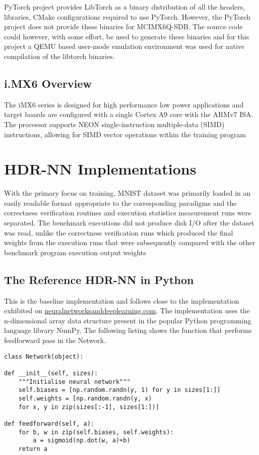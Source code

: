 PyTorch project provides LibTorch as a binary distribution of all the headers, libraries, CMake configurations required to use PyTorch. However, the PyTorch project does not provide these binaries for MCIMX6Q-SDB. The source code could however, with some effort, be used to generate these binaries and for this project a QEMU based user-mode emulation environment was used for native compilation of the libtorch binaries.

\subsection{i.MX6 Overview}

The iMX6 series is designed for high performance low power applications and target boards are configured with a single Cortex A9 core with the ARMv7 ISA. The processor supports NEON single-instruction multiple-data (SIMD) instructions, allowing for SIMD vector operations within the training program

\section{HDR-NN Implementations}

With the primary focus on training, MNIST dataset was primarily loaded in an easily readable format appropriate to the corresponding paradigms and the correctness verification routines and execution statistics measurement runs were separated. The benchmark executions did not produce disk I/O after the dataset was read, unlike the correctness verification runs which produced the final weights from the execution runs that were subsequently compared with the other benchmark program execution output weights


\subsection{The Reference HDR-NN in Python}

This is the baseline implementation and follows close to the implementation exhibited on \href{http://neuralnetworksanddeeplearning.com}{neuralnetworksanddeeplearning.com}. The implementation uses the n-dimensional array data structure present in the popular Python programming language library NumPy. The following listing shows the function that performs feedforward pass in the Network.

\begin{verbatim}
class Network(object):

def __init__(self, sizes):
	"""Initialise neural network"""
	self.biases = [np.random.randn(y, 1) for y in sizes[1:]]
	self.weights = [np.random.randn(y, x)
	for x, y in zip(sizes[:-1], sizes[1:])]

def feedforward(self, a):
	for b, w in zip(self.biases, self.weights):
		a = sigmoid(np.dot(w, a)+b)
	return a
\end{verbatim}

